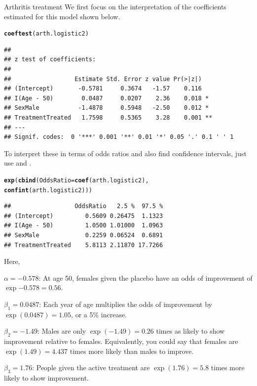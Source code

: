 \documentclass[11pt]{book}\usepackage[]{graphicx}\usepackage[]{color}
\makeatletter
\newcommand{\hlstd}[1]{\textcolor[rgb]{0.345,0.345,0.345}{#1}}%
\newcommand{\hlkwc}[1]{\textcolor[rgb]{0.333,0.667,0.333}{#1}}%
\newcommand{\hlkwd}[1]{\textcolor[rgb]{0.737,0.353,0.396}{\textbf{#1}}}%
\newenvironment{kframe}{%
 \def\at@end@of@kframe{}%
 \ifinner\ifhmode%
  \def\at@end@of@kframe{\end{minipage}}%
  \begin{minipage}{\columnwidth}%
 \fi\fi%
 \def\FrameCommand##1{\hskip\@totalleftmargin \hskip-\fboxsep
 \colorbox{shadecolor}{##1}\hskip-\fboxsep
     \hskip-\linewidth \hskip-\@totalleftmargin \hskip\columnwidth}%
 \MakeFramed {\advance\hsize-\width
   \@totalleftmargin\z@ \linewidth\hsize
   \@setminipage}}%
 {\par\unskip\endMakeFramed%
 \at@end@of@kframe}
\newenvironment{knitrout}{}{} %
\renewenvironment{knitrout}{\small\renewcommand{\baselinestretch}{.85}}{} %
\makeatother
\begin{document}
\begin{Example}{Arthritis treatment}
We first focus on the interpretation of the coefficients estimated for this model
shown below.
\begin{knitrout}
\color{fgcolor}\begin{kframe}
\begin{alltt}
\hlkwd{coeftest}\hlstd{(arth.logistic2)}
\end{alltt}
\begin{verbatim}
## 
## z test of coefficients:
## 
##                  Estimate Std. Error z value Pr(>|z|)   
## (Intercept)       -0.5781     0.3674   -1.57    0.116   
## I(Age - 50)        0.0487     0.0207    2.36    0.018 * 
## SexMale           -1.4878     0.5948   -2.50    0.012 * 
## TreatmentTreated   1.7598     0.5365    3.28    0.001 **
## ---
## Signif. codes:  0 '***' 0.001 '**' 0.01 '*' 0.05 '.' 0.1 ' ' 1
\end{verbatim}
\end{kframe}
\end{knitrout}
To interpret these in terms of odds ratios and also find confidence intervals,
just use  and .
\begin{knitrout}
\color{fgcolor}\begin{kframe}
\begin{alltt}
\hlkwd{exp}\hlstd{(}\hlkwd{cbind}\hlstd{(}\hlkwc{OddsRatio}\hlstd{=}\hlkwd{coef}\hlstd{(arth.logistic2),}
          \hlkwd{confint}\hlstd{(arth.logistic2)))}
\end{alltt}
\begin{verbatim}
##                  OddsRatio   2.5 %  97.5 %
## (Intercept)         0.5609 0.26475  1.1323
## I(Age - 50)         1.0500 1.01000  1.0963
## SexMale             0.2259 0.06524  0.6891
## TreatmentTreated    5.8113 2.11870 17.7266
\end{verbatim}
\end{kframe}
\end{knitrout}
Here,
\begin{itemize*}
  \item $\alpha = -0.578$: At age 50, females given the placebo have an odds of improvement
  of  $\exp{-0.578} = 0.56$.
  \item $\beta_1 = 0.0487$: Each year of age multiplies the odds of improvement by
  $\exp(0.0487) = 1.05$, or a 5\% increase.
  \item $\beta_2 = -1.49$: Males are only $\exp(-1.49) = 0.26$ times as likely to show
  improvement relative to females.  Equivalently, you could say that females are
  $\exp(1.49) = 4.437$ times more likely than males to improve.
  \item $\beta_3 = 1.76$: People given the active treatment are $\exp(1.76) = 5.8$
  times more likely to show improvement.
\end{itemize*}


\end{Example}
\end{document}
